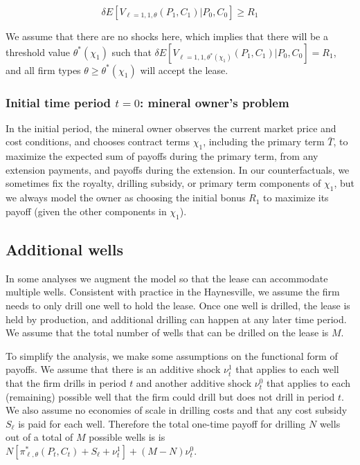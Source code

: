\documentclass[12pt]{article}
\begin{document}
\begin{equation}
\delta E [V_{\ell=1,1,\theta}(P_1,C_1)|P_0,C_0] \geq R_1
\end{equation}

We assume that there are no shocks here, which implies that there will be a threshold value $\theta^*(\chi_1)$ such that $ \delta E [V_{\ell=1,1,\theta^*(\chi_1)}(P_1,C_1)|P_0,C_0] = R_1$, and all firm types $\theta \geq \theta^*(\chi_1)$ will accept the lease.

\subsubsection{Initial time period $t = 0$: mineral owner's problem}

In the initial period, the mineral owner observes the current market price and cost conditions, and chooses contract terms $\chi_1$, including the primary term $\bar{T}$, to maximize the expected sum of payoffs during the primary term, from any extension payments, and payoffs during the extension. In our counterfactuals, we sometimes fix the royalty, drilling subsidy, or primary term components of $\chi_1$, but we always model the owner as choosing the initial bonus $R_1$ to maximize its payoff (given the other components in $\chi_1$).


\subsection{Additional wells \label{appx:additional_wells}}

In some analyses we augment the model so that the lease can accommodate multiple wells. Consistent with practice in the Haynesville, we assume the firm needs to only drill one well to hold the lease. Once one well is drilled, the lease is held by production, and additional drilling can happen at any later time period. We assume that the total number of wells that can be drilled on the lease is $M$.

To simplify the analysis, we make some assumptions on the functional form of payoffs. We assume that there is an additive shock $\nu^1_t$ that applies to each well that the firm drills in period $t$ and another additive shock $\nu^0_t$ that applies to each (remaining) possible well that the firm could drill but does not drill in period $t$. We also assume no economies of scale in drilling costs and that any cost subsidy $S_{\ell}$ is paid for each well. Therefore the total one-time payoff for drilling $N$ wells out of a total of $M$ possible wells is is $N [\pi^*_{\ell,\theta}(P_t,C_t) + S_{\ell} + \nu^1_t] + (M - N) \nu^0_t$.
\end{document}
